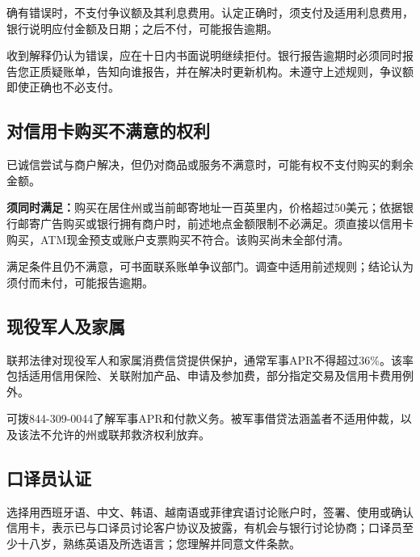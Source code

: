 \documentclass[UTF8,fontset=none,11pt,a4paper]{ctexart}
\begin{document}
确有错误时，不支付争议额及其利息费用。认定正确时，须支付及适用利息费用，银行说明应付金额及日期；之后不付，可能\allowbreak\mbox{报告逾期。}


收到解释仍认为错误，应在十日内书面说明继续拒付。银行报告逾期时必须同时报告您正质疑账单，告知向谁报告，并在解决时更新机构。未遵守上述规则，争议额即使正确也\allowbreak\mbox{不必支付。}


\subsection*{对信用卡购买不满意的权利}
已诚信尝试与商户解决，但仍对商品或服务不满意时，可能有权不支付购买的\allowbreak\mbox{剩余金额。}


\textbf{须同时满足：}购买在居住州或当前邮寄地址一百英里内，价格超过50美元；依据银行邮寄广告购买或银行拥有商户时，前述地点金额限制不必满足。须直接以信用卡购买，ATM现金预支或账户支票购买不符合。该购买尚未\allowbreak\mbox{全部付清。}


满足条件且仍不满意，可书面联系账单争议部门。调查中适用前述规则；结论认为须付而未付，可能\allowbreak\mbox{报告逾期。}


\subsection*{现役军人及家属}
联邦法律对现役军人和家属消费信贷提供保护，通常军事APR不得超过36\%。该率包括适用信用保险、关联附加产品、申请及参加费，部分指定交易及信用卡\allowbreak\mbox{费用例外。}


可拨844-309-0044了解军事APR和付款义务。被军事借贷法涵盖者不适用仲裁，以及该法不允许的州或联邦救济\allowbreak\mbox{权利放弃。}


\subsection*{口译员认证}
选择用西班牙语、中文、韩语、越南语或菲律宾语讨论账户时，签署、使用或确认信用卡，表示已与口译员讨论客户协议及披露，有机会与银行讨论协商；口译员至少十八岁，熟练英语及所选语言；您理解并同意\allowbreak\mbox{文件条款。}
\end{document}
